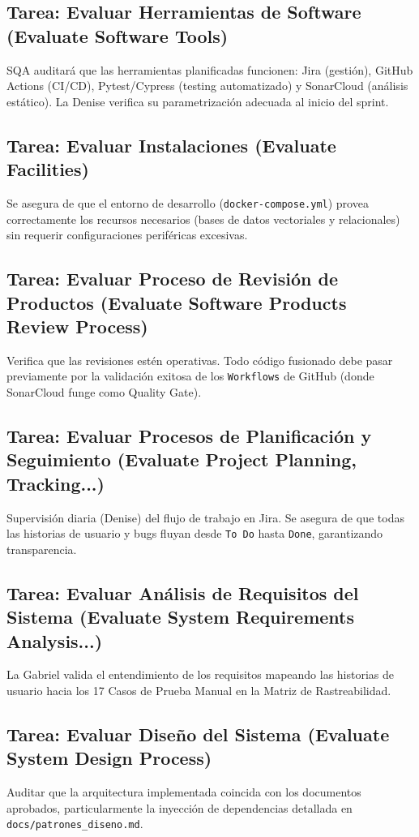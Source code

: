 \documentclass[12pt,a4paper]{article}
\begin{document}
\subsection{Tarea: Evaluar Herramientas de Software (Evaluate Software Tools)}
SQA auditará que las herramientas planificadas funcionen: Jira (gestión), GitHub Actions (CI/CD), Pytest/Cypress (testing automatizado) y SonarCloud (análisis estático). La Denise verifica su parametrización adecuada al inicio del sprint.

\subsection{Tarea: Evaluar Instalaciones (Evaluate Facilities)}
Se asegura de que el entorno de desarrollo (\texttt{docker-compose.yml}) provea correctamente los recursos necesarios (bases de datos vectoriales y relacionales) sin requerir configuraciones periféricas excesivas.

\subsection{Tarea: Evaluar Proceso de Revisión de Productos (Evaluate Software Products Review Process)}
Verifica que las revisiones estén operativas. Todo código fusionado debe pasar previamente por la validación exitosa de los \texttt{Workflows} de GitHub (donde SonarCloud funge como Quality Gate).

\subsection{Tarea: Evaluar Procesos de Planificación y Seguimiento (Evaluate Project Planning, Tracking...)}
Supervisión diaria (Denise) del flujo de trabajo en Jira. Se asegura de que todas las historias de usuario y bugs fluyan desde \texttt{To Do} hasta \texttt{Done}, garantizando transparencia.

\subsection{Tarea: Evaluar Análisis de Requisitos del Sistema (Evaluate System Requirements Analysis...)}
La Gabriel valida el entendimiento de los requisitos mapeando las historias de usuario hacia los 17 Casos de Prueba Manual en la Matriz de Rastreabilidad.

\subsection{Tarea: Evaluar Diseño del Sistema (Evaluate System Design Process)}
Auditar que la arquitectura implementada coincida con los documentos aprobados, particularmente la inyección de dependencias detallada en \texttt{docs/patrones\_diseno.md}.
\end{document}
